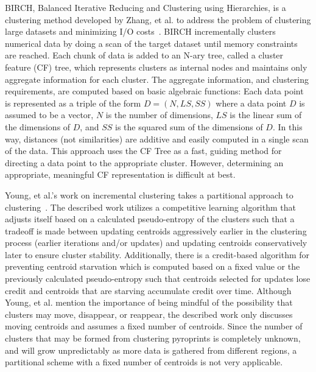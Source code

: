 \documentclass[12pt]{ucthesis}
\begin{document}
   BIRCH, Balanced Iterative Reducing and Clustering using Hierarchies, is a
   clustering method developed by Zhang, et al. to address the problem of
   clustering large datasets and minimizing I/O costs~\cite{Zhang:BIRCH}. BIRCH
   incrementally clusters numerical data by doing a scan of the target dataset
   until memory constraints are reached. Each chunk of data is added to an
   N-ary tree, called a cluster feature (CF) tree, which represents clusters as
   internal nodes and maintains only aggregate information for each cluster.
   The aggregate information, and clustering requirements, are computed based
   on basic algebraic functions: Each data point is represented as a triple of
   the form $D = (N, LS, SS)$ where a data point $D$ is assumed to be a vector,
   $N$ is the number of dimensions, $LS$ is the linear sum of the dimensions of
   $D$, and $SS$ is the squared sum of the dimensions of $D$. In this way,
   distances (not similarities) are additive and easily computed in a single
   scan of the data. This approach uses the CF Tree as a fast, guiding method
   for directing a data point to the appropriate cluster. However, determining
   an appropriate, meaningful CF representation is difficult at best.

   Young, et al.'s work on incremental clustering takes a partitional approach
   to clustering~\cite{Young:Incremental}. The described work utilizes a
   competitive learning algorithm that adjusts itself based on a calculated
   pseudo-entropy of the clusters such that a tradeoff is made between updating
   centroids aggressively earlier in the clustering process (earlier iterations
   and/or updates) and updating centroids conservatively later to ensure
   cluster stability. Additionally, there is a credit-based algorithm for
   preventing centroid starvation which is computed based on a fixed value or
   the previously calculated pseudo-entropy such that centroids selected for
   updates lose credit and centroids that are starving accumulate credit over
   time. Although Young, et al. mention the importance of being mindful of the
   possibility that clusters may move, disappear, or reappear, the described
   work only discusses moving centroids and assumes a fixed number of
   centroids. Since the number of clusters that may be formed from clustering
   pyroprints is completely unknown, and will grow unpredictably as more data
   is gathered from different regions, a partitional scheme with a fixed number
   of centroids is not very applicable.
\end{document}

